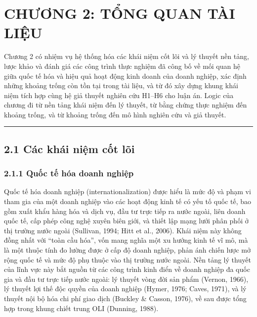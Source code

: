 \documentclass[
  a4paper,
  13pt]{extreport}
\begin{document}
\newpage

\hypertarget{chux1b0ux1a1ng-2-tux1ed5ng-quan-tuxe0i-liux1ec7u}{%
\chapter{CHƯƠNG 2: TỔNG QUAN TÀI
LIỆU}\label{chux1b0ux1a1ng-2-tux1ed5ng-quan-tuxe0i-liux1ec7u}}

Chương 2 có nhiệm vụ hệ thống hóa các khái niệm cốt lõi và lý thuyết nền
tảng, lược khảo và đánh giá các công trình thực nghiệm đã công bố về mối
quan hệ giữa quốc tế hóa và hiệu quả hoạt động kinh doanh của doanh
nghiệp, xác định những khoảng trống còn tồn tại trong tài liệu, và từ đó
xây dựng khung khái niệm tích hợp cùng hệ giả thuyết nghiên cứu H1--H6
cho luận án. Logic của chương đi từ nền tảng khái niệm đến lý thuyết, từ
bằng chứng thực nghiệm đến khoảng trống, và từ khoảng trống đến mô hình
nghiên cứu và giả thuyết.

\begin{center}\rule{0.5\linewidth}{0.5pt}\end{center}

\hypertarget{cuxe1c-khuxe1i-niux1ec7m-cux1ed1t-luxf5i}{%
\section{2.1 Các khái niệm cốt
lõi}\label{cuxe1c-khuxe1i-niux1ec7m-cux1ed1t-luxf5i}}

\hypertarget{quux1ed1c-tux1ebf-huxf3a-doanh-nghiux1ec7p}{%
\subsection{2.1.1 Quốc tế hóa doanh
nghiệp}\label{quux1ed1c-tux1ebf-huxf3a-doanh-nghiux1ec7p}}

Quốc tế hóa doanh nghiệp (internationalization) được hiểu là mức độ và
phạm vi tham gia của một doanh nghiệp vào các hoạt động kinh tế có yếu
tố quốc tế, bao gồm xuất khẩu hàng hóa và dịch vụ, đầu tư trực tiếp ra
nước ngoài, liên doanh quốc tế, cấp phép công nghệ xuyên biên giới, và
thiết lập mạng lưới phân phối ở thị trường nước ngoài (Sullivan, 1994;
Hitt et al., 2006). Khái niệm này không đồng nhất với ``toàn cầu hóa'',
vốn mang nghĩa một xu hướng kinh tế vĩ mô, mà là một thuộc tính đo lường
được ở cấp độ doanh nghiệp, phản ánh chiến lược mở rộng quốc tế và mức
độ phụ thuộc vào thị trường nước ngoài. Nền tảng lý thuyết của lĩnh vực
này bắt nguồn từ các công trình kinh điển về doanh nghiệp đa quốc gia và
đầu tư trực tiếp nước ngoài: lý thuyết vòng đời sản phẩm (Vernon, 1966),
lý thuyết lợi thế độc quyền của doanh nghiệp (Hymer, 1976; Caves, 1971),
và lý thuyết nội bộ hóa chi phí giao dịch (Buckley \& Casson, 1976), về
sau được tổng hợp trong khung chiết trung OLI (Dunning, 1988).
\end{document}
